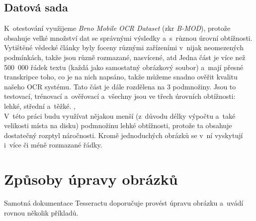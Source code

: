 \documentclass[12pt,oneside]{report}			%
\begin{document}
	\subsection{Datová sada}
	\label{sec:DataSet}
	K~otestování  využijeme \emph{Brno Mobile OCR Dataset} (\gls{zkr} \emph{\gls{B-MOD}}), protože obsahuje velké množství dat se správnými výsledky a~s~různou úrovní obtížnosti. Vytištěné vědecké články byly foceny různými zařízeními v~nijak neomezených podmínkách, takže jsou různě rozmazané, nasvícené, \gls{atd} Jedna část je více než 500~000 řádek textu (každá jako samostatný obrázkový soubor) a~mají přesné transkripce toho, co je na nich napsáno, takže můžeme snadno ověřit kvalitu našeho \gls{OCR} systému.  Tato část je dále rozdělena na 3 podmnožiny. Jsou to testovací, trénovací a~ověřovací a~všechny jsou ve třech úrovních obtížnosti: lehké, střední a~těžké. \parencite{pero_dataset}, \parencite{BMOD_article}\\
	V~této práci budu využívat nějakou menší (z~důvodu délky výpočtu a~také velikosti místa na disku) podmnožinu lehké obtížnosti, protože ta obsahuje dostatečný rozptyl náročnosti. Kromě jednoduchých obrázků se v~ní vyskytují i~více či méně rozmazané řádky.
	\section{Způsoby úpravy obrázků}
	Samotná dokumentace Tesseractu doporučuje provést úpravu obrázku a~uvádí rovnou několik příkladů.  \parencite{Tess_wiki_improve}
\end{document}
